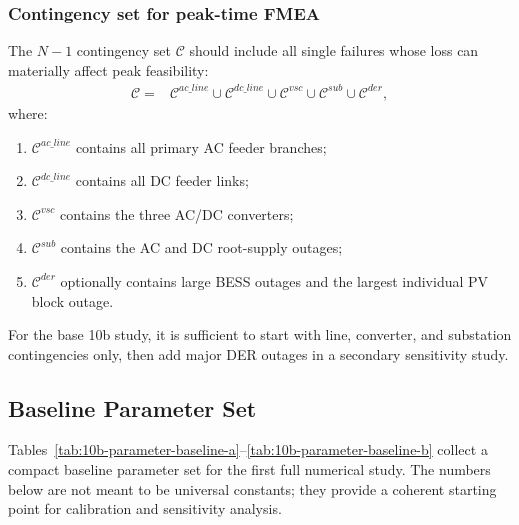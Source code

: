 \subsubsection{Contingency set for peak-time FMEA}

The \(N{-}1\) contingency set \(\mathcal{C}\) should include all single failures whose loss can materially affect peak feasibility:
\begin{align}
\mathcal{C} =
&\mathcal{C}^{ac\_line}
\cup \mathcal{C}^{dc\_line}
\cup \mathcal{C}^{vsc}
\cup \mathcal{C}^{sub}
\cup \mathcal{C}^{der},
\end{align}
where:
\begin{enumerate}
  \item \(\mathcal{C}^{ac\_line}\) contains all primary AC feeder branches;
  \item \(\mathcal{C}^{dc\_line}\) contains all DC feeder links;
  \item \(\mathcal{C}^{vsc}\) contains the three AC/DC converters;
  \item \(\mathcal{C}^{sub}\) contains the AC and DC root-supply outages;
  \item \(\mathcal{C}^{der}\) optionally contains large BESS outages and the largest individual PV block outage.
\end{enumerate}

For the base 10b study, it is sufficient to start with line, converter, and substation contingencies only, then add major DER outages in a secondary sensitivity study.

\subsection{Baseline Parameter Set}

Tables~\ref{tab:10b-parameter-baseline-a}--\ref{tab:10b-parameter-baseline-b} collect a compact baseline parameter set for the first full numerical study. The numbers below are not meant to be universal constants; they provide a coherent starting point for calibration and sensitivity analysis.

